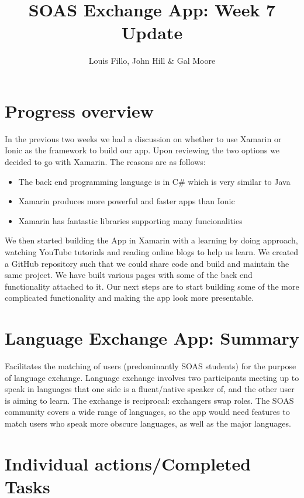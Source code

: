 \documentclass[11pt]{article} \usepackage[utf8]{inputenc}
\title{SOAS Exchange App: Week 7 Update}
\author{Louis Fillo, John Hill & Gal Moore}
\begin{document}
\maketitle
 
\section{Progress overview}
In the previous two weeks we had a discussion on whether to use Xamarin
or Ionic as the framework to build our app. Upon reviewing the two options we
decided to go with Xamarin. The reasons are as follows:
 
\begin{itemize}
  \item The back end programming language is in C# which is very similar to Java
  \item Xamarin produces more powerful and faster apps than Ionic
  \item Xamarin has fantastic libraries supporting many funcionalities
\end{itemize}
 
We then started building the App in Xamarin with a learning by doing approach,
watching YouTube tutorials and reading online blogs to help us learn. We
created a GitHub repository such that we could share code and build and
maintain the same project. We have built various pages with some of the back end
functionality attached to it. Our next steps are to start building some of the
more complicated functionality and making the app look more presentable.
 
\section{Language Exchange App: Summary}
Facilitates the matching of users (predominantly SOAS students) for the purpose
of language exchange.  Language exchange involves two participants meeting up to
speak in languages that one side is a fluent/native speaker of, and the other
user is aiming to learn.  The exchange is reciprocal: exchangers swap roles.
The SOAS community covers a wide range of languages, so the app would need
features to match users who speak more obscure languages, as well as the major
languages.
 
\section{Individual actions/Completed Tasks}
 
\end{document}
